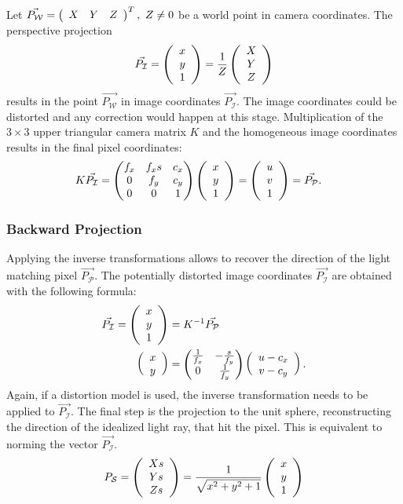Let $\vec{P_\mathcal{W}} = \left(\begin{array}{ccc} X & Y & Z \end{array}\right)^T,~Z \neq 0$ be a world point in camera coordinates.
The perspective projection
\begin{equation}
    \vec{P_\mathcal{I}} = \left(\begin{array}{c} x \\ y \\ 1 \end{array}\right) = \frac{1}{Z}\left(\begin{array}{c} X \\ Y \\ Z \end{array}\right)
    \label{eq:pinhole_forward}
\end{equation}
results in the point $\vec{P_\mathcal{W}}$ in image coordinates $\vec{P_\mathcal{I}}$.
The image coordinates could be distorted and any correction would happen at this stage.
Multiplication of the $3 \times 3$ upper triangular camera matrix $K$ and the homogeneous image coordinates results in the final pixel coordinates:
\begin{equation}
\begin{aligned}
    K \vec{P_\mathcal{I}} &= \begin{pmatrix}
        f_x & f_x s & c_x \\
        0   & f_y   & c_y \\
        0   & 0     & 1
    \end{pmatrix}\left(\begin{array}{c} x \\ y \\ 1 \end{array}\right) = \left(\begin{array}{c} u \\ v \\ 1 \end{array}\right) = \vec{P_\mathcal{P}}\text{.}
\end{aligned}
\end{equation}

\subsubsection*{Backward Projection}

Applying the inverse transformations allows to recover the direction of the light matching pixel $\vec{P_\mathcal{P}}$.
The potentially distorted image coordinates $\vec{P_\mathcal{I}}$ are obtained with the following formula:
\begin{equation}
\begin{aligned}
    \vec{P_\mathcal{I}} = \left(\begin{array}{c} x \\ y \\ 1 \end{array}\right) &= K^{-1} \vec{P_\mathcal{P}} \\
    \left(\begin{array}{c} x \\ y \end{array}\right) &= \begin{pmatrix}\frac{1}{f_x} & -\frac{s}{f_y} \\ 0 & \frac{1}{f_y}\end{pmatrix} \left(\begin{array}{c} u - c_x \\ v - c_y \end{array}\right)\text{.}
\end{aligned}
\end{equation}
Again, if a distortion model is used, the inverse transformation needs to be applied to $\vec{P_\mathcal{I}}$.
The final step is the projection to the unit sphere, reconstructing the direction of the idealized light ray, that hit the pixel.
This is equivalent to norming the vector $\vec{P_\mathcal{I}}$.
\begin{equation}
    P_\mathcal{S} = \left(\begin{array}{c} Xs \\ Ys \\ Zs \end{array}\right) = \frac{1}{\sqrt{x^2 + y^2 + 1}} \left(\begin{array}{c} x \\ y \\ 1 \end{array}\right)
    \label{eq:pinhole_backward}
\end{equation}

